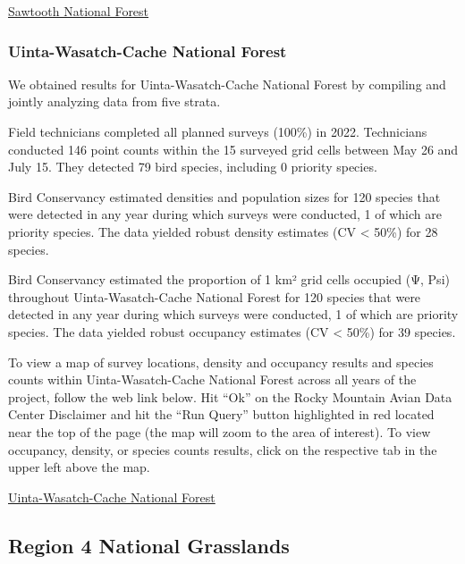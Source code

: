\documentclass[
  letterpaper,
  DIV=11,
  numbers=noendperiod,
  oneside]{scrreprt}
\begin{document}
\href{http://www.rmbo.org/new_site/adc/QueryWindow.aspx\#N4IgzgrgDgpgTmALnAhoiBbEAuABCAZRQHdEB7MxAC1wDk0BLMgOxQBtcAxMuGJEAL5A}{Sawtooth
National Forest}

\hypertarget{uinta-wasatch-cache-national-forest}{%
\subsubsection{Uinta-Wasatch-Cache National
Forest}\label{uinta-wasatch-cache-national-forest}}

We obtained results for Uinta-Wasatch-Cache National Forest by compiling
and jointly analyzing data from five strata.

Field technicians completed all planned surveys (100\%) in 2022.
Technicians conducted 146 point counts within the 15 surveyed grid cells
between May 26 and July 15. They detected 79 bird species, including 0
priority species.

Bird Conservancy estimated densities and population sizes for 120
species that were detected in any year during which surveys were
conducted, 1 of which are priority species. The data yielded robust
density estimates (CV \textless{} 50\%) for 28 species.

Bird Conservancy estimated the proportion of 1 km² grid cells occupied
(Ψ, Psi) throughout Uinta-Wasatch-Cache National Forest for 120 species
that were detected in any year during which surveys were conducted, 1 of
which are priority species. The data yielded robust occupancy estimates
(CV \textless{} 50\%) for 39 species.

To view a map of survey locations, density and occupancy results and
species counts within Uinta-Wasatch-Cache National Forest across all
years of the project, follow the web link below. Hit ``Ok'' on the Rocky
Mountain Avian Data Center Disclaimer and hit the ``Run Query'' button
highlighted in red located near the top of the page (the map will zoom
to the area of interest). To view occupancy, density, or species counts
results, click on the respective tab in the upper left above the map.

\href{http://www.rmbo.org/new_site/adc/QueryWindow.aspx\#N4IgzgrgDgpgTmALnAhoiBbEAuABCAVQEsA7RFAWgHUUw0BjACwoGEUmZcA5NIgexIoANrgBifODCQgAvkA=}{Uinta-Wasatch-Cache
National Forest}

\hypertarget{region-4-national-grasslands}{%
\subsection{Region 4 National
Grasslands}\label{region-4-national-grasslands}}
\end{document}
